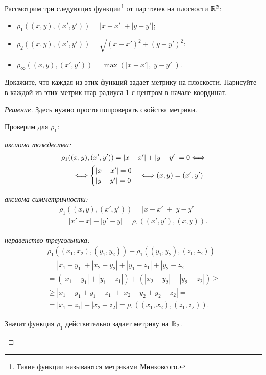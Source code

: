 \documentclass[10pt]{article}
\begin{document}
\begin{tasks}
    \item Рассмотрим три следующих функции\footnote{Такие функции называются метриками Минковсого.} от пар точек на плоскости $\mathbb R^2$:
        \begin{itemize}
            \item $\rho_1((x,y), (x',y')) = |x-x'|+|y-y'|$;
            \item $\rho_2((x,y), (x',y')) = \sqrt{(x-x')^2+(y-y')^2}$;
            \item $\rho_\infty((x,y), (x',y')) = \max(|x-x'|, |y-y'|).$
        \end{itemize}
    Докажите, что каждая из этих функций задает метрику на плоскости. Нарисуйте в каждой из этих метрик шар радиуса 1 с центром в начале координат.
    \begin{proof}
        [Решение]
        Здесь нужно просто попроверять свойства метрики.
        \begin{conditions}
            \item Проверим для $\rho_1$: \begin{conditions}
                \item \textit{аксиома тождества:}\begin{align*}
                    \rho_1((x,y), (x',y')) = |x-x'|+|y-y'| = 0 \Longleftrightarrow\\\Longleftrightarrow \begin{cases}
                        |x-x'| = 0\\
                        |y-y'| = 0
                    \end{cases} \Longleftrightarrow (x, y) = (x', y').
                \end{align*}
                \item \textit{аксиома симметричности:}
                \begin{align*}
                    \rho_1((x,y),(x',y')) = |x-x'|+|y-y'| =\\= |x'-x|+|y'-y| = \rho_1((x',y'),(x,y)).
                \end{align*}
                \item \textit{неравенство треугольника:}
                \begin{align*}
                    &\rho_1((x_1,x_2),(y_1,y_2)) + \rho_1((y_1, y_2),(z_1, z_2)) =\\
                    &= |x_1-y_1|+|x_2-y_2| + |y_1-z_1|+|y_2-z_2| = \\
                    &= (|x_1-y_1|+ |y_1-z_1|)+(|x_2-y_2| +|y_2-z_2|) \geqslant \\
                    &\geqslant |x_1-y_1+y_1-z_1|+|x_2-y_2+y_2-z_2| = \\
                    &=|x_1-z_1|+|x_2-z_2| = \rho_1((x_1, x_2), (z_1,z_2)).
                \end{align*}
            \end{conditions}
            Значит функция $\rho_1$ действительно задает метрику на $\mathbb R_2$. 
            

\end{conditions}
\end{proof}
\end{tasks}
\end{document}

